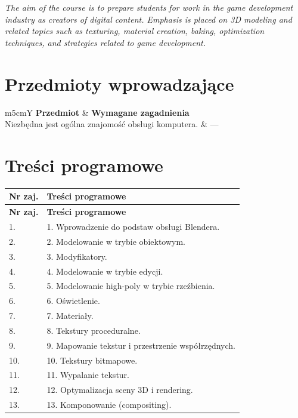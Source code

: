 \documentclass[12pt, a4paper]{article}
\newcommand{\thdrule}{\noalign{\global\setlength{\extrarowheight}{0pt}}}
\newcommand{\thdend}{\noalign{\global\setlength{\extrarowheight}{3pt}}}
\begin{document}
\textit{The aim of the course is to prepare students for work in the game development industry as creators of digital content. Emphasis is placed on 3D modeling and related topics such as texturing, material creation, baking, optimization techniques, and strategies related to game development.}


\section{Przedmioty wprowadzające}

{\scriptsize
\begin{tabularx}{\textwidth}{m{5cm}Y}
\thdrule\toprule
{} {\color{white}\textbf{Przedmiot}} & {\color{white}\textbf{Wymagane zagadnienia}} \\
\midrule\thdend
   Niezbędna jest ogólna znajomość obsługi komputera. & --- \\
\bottomrule
\end{tabularx}}

\section{Treści programowe}

{\scriptsize
\begin{longtable}{m{1.5cm}m{14.5cm}}
\thdrule\toprule
\rowcolor{pjatkRed} {\color{white}\textbf{Nr zaj.}} & {\color{white}\textbf{Treści programowe}} \\
\midrule\thdend
\endfirsthead
\thdrule\toprule
\rowcolor{pjatkRed} {\color{white}\textbf{Nr zaj.}} & {\color{white}\textbf{Treści programowe}} \\
\midrule\thdend
\endhead
  \rowcolor{tableRowLight} 1. & 1. Wprowadzenie do podstaw obsługi Blendera. \\
  \rowcolor{tableRowAlt} 2. & 2. Modelowanie w trybie obiektowym. \\
  \rowcolor{tableRowLight} 3. & 3. Modyfikatory. \\
  \rowcolor{tableRowAlt} 4. & 4. Modelowanie w trybie edycji. \\
  \rowcolor{tableRowLight} 5. & 5. Modelowanie high-poly w trybie rzeźbienia. \\
  \rowcolor{tableRowAlt} 6. & 6. Oświetlenie. \\
  \rowcolor{tableRowLight} 7. & 7. Materiały. \\
  \rowcolor{tableRowAlt} 8. & 8. Tekstury proceduralne. \\
  \rowcolor{tableRowLight} 9. & 9. Mapowanie tekstur i przestrzenie współrzędnych. \\
  \rowcolor{tableRowAlt} 10. & 10. Tekstury bitmapowe. \\
  \rowcolor{tableRowLight} 11. & 11. Wypalanie tekstur. \\
  \rowcolor{tableRowAlt} 12. & 12. Optymalizacja sceny 3D i rendering. \\
  \rowcolor{tableRowLight} 13. & 13. Komponowanie (compositing). \\
\bottomrule
\end{longtable}}
\end{document}
